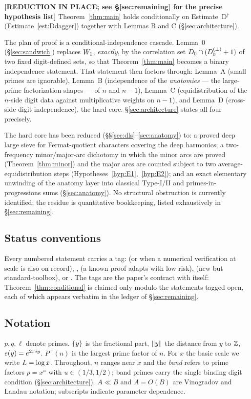 \begin{theorem}\label{thm:conditional}
\textbf{[REDUCTION IN PLACE; see \S\ref{sec:remaining} for the precise
hypothesis list]}\quad
Theorem~\ref{thm:main} holds conditionally on Estimate~D$^\dagger$
(Estimate~\ref{est:Ddagger}) together with Lemmas B and C
(\S\ref{sec:architecture}).
\end{theorem}

The plan of proof is a conditional-independence cascade. Lemma~0
(\S\ref{sec:sandwich}) replaces $W_1$, \emph{exactly}, by the correlation
set $D_0\cap(D_0^{(\pm)}+1)$ of two fixed digit-defined sets, so that
Theorem~\ref{thm:main} becomes a binary independence statement. That
statement then factors through: Lemma~A (small primes are ignorable),
Lemma~B (independence of the \emph{anatomies} --- the large-prime
factorization shapes --- of $n$ and $n-1$), Lemma~C (equidistribution of the
$n$-side digit data against multiplicative weights on $n-1$), and Lemma~D
(cross-side digit independence), the hard core. \S\ref{sec:architecture}
states all four precisely.

The hard core has been reduced (\S\S\ref{sec:dls}--\ref{sec:anatomy}) to:
a proved deep large sieve for Fermat-quotient characters covering the deep
harmonics; a two-frequency minor/major-arc dichotomy in which the minor
arcs are proved (Theorem~\ref{thm:minor}) and the major arcs are counted
subject to two average-equidistribution steps
(Hypotheses~\ref{hyp:E1},~\ref{hyp:E2}); and an exact elementary unwinding
of the anatomy layer into classical Type-I/II and primes-in-progressions
sums (\S\ref{sec:anatomy}). No structural obstruction is currently
identified; the residue is quantitative bookkeeping, listed exhaustively in
\S\ref{sec:remaining}.

\subsection{Status conventions}

Every numbered statement carries a tag: \statusP{} (or \statusPM{} when a
numerical verification at scale is also on record), \statusC, \statusKA{}
(a known proof adapts with low risk), \statusN{} (new but
standard-toolbox), or \statusO. The tags are the paper's contract with
itself: Theorem~\ref{thm:conditional} is claimed only modulo the statements
tagged open, each of which appears verbatim in the ledger of
\S\ref{sec:remaining}.

\subsection{Notation}

$p,q,\ell$ denote primes. $\left\{y\right\}$ is the fractional part, $\left\| y\right\|$ the
distance from $y$ to $\mathbb{Z}$, $e\!\left(y\right)=e^{2\pi iy}$. $P^+(n)$ is the largest
prime factor of $n$. For $x$ the basic scale we write $L=\log x$.
Throughout, $n$ ranges near $x$ and the \emph{band} refers to prime factors
$p=x^{u}$ with $u\in(1/3,1/2)$; band primes carry the single binding digit
condition (\S\ref{sec:architecture}). $A\ll B$ and $A=O(B)$ are Vinogradov
and Landau notation; subscripts indicate parameter dependence.
